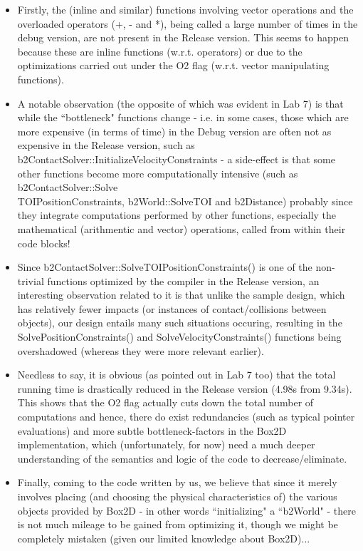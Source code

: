 \documentclass [a4paper, 11pt] {article}
\begin{document}
\begin {itemize}
	\item Firstly, the (inline and similar) functions involving vector operations and the overloaded operators (+, - and *), being called
	a large number of times in the debug version, are not present in the Release version. This seems to happen because these are
	inline functions (w.r.t. operators) or due to the optimizations carried out under the O2 flag (w.r.t. vector manipulating functions).
	\item A notable observation (the opposite of which was evident in Lab 7) is that while the ``bottleneck" functions change - i.e.
	in some cases, those which are more expensive (in terms of time) in the Debug version are often not as expensive in
	the Release version, such as b2ContactSolver::InitializeVelocityConstraints - a side-effect is that some other functions become
	more computationally intensive (such as b2ContactSolver::Solve\\TOIPositionConstraints, b2World::SolveTOI and b2Distance)
	probably since they integrate computations performed by other functions, especially the mathematical (arithmentic and vector)
	operations, called from within their code blocks!
	\item Since b2ContactSolver::SolveTOIPositionConstraints() is one of the non-trivial functions optimized by the compiler in the
	Release version, an interesting observation related to it is that unlike the sample design, which has relatively fewer impacts
	(or instances of contact/collisions between objects), our design entails many such situations occuring, resulting in the
	SolvePositionConstraints() and SolveVelocityConstraints() functions being overshadowed (whereas they were more relevant earlier).
	\item Needless to say, it is obvious (as pointed out in Lab 7 too) that the total running time is drastically reduced in the Release
	version (4.98s from 9.34s). This shows that the O2 flag actually cuts down the total number of computations and hence,
	there do exist redundancies (such as typical pointer evaluations) and more subtle bottleneck-factors in the Box2D implementation,
	which (unfortunately, for now) need a much deeper understanding of the semantics and logic of the code to decrease/eliminate.
	\item Finally, coming to the code written by us, we believe that since it merely involves placing (and choosing the physical
	characteristics of) the various objects provided by Box2D - in other words ``initializing" a ``b2World" - there is not much
	mileage to be gained from optimizing it, though we might be completely mistaken (given our limited knowledge about Box2D)...
\end {itemize}
\end{document}
